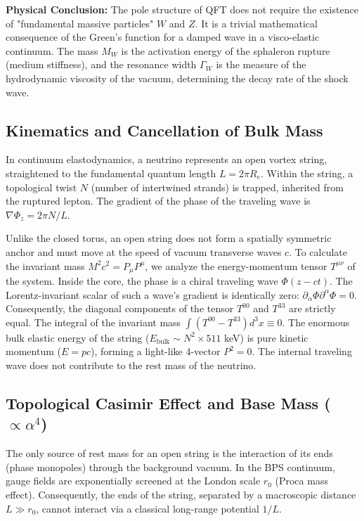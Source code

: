 \documentclass[11pt,a4paper]{article}
\begin{document}
\textbf{Physical Conclusion:} The pole structure of QFT does not require the existence of "fundamental massive particles" $W$ and $Z$. It is a trivial mathematical consequence of the Green's function for a damped wave in a visco-elastic continuum. The mass $M_W$ is the activation energy of the sphaleron rupture (medium stiffness), and the resonance width $\Gamma_W$ is the measure of the hydrodynamic viscosity of the vacuum, determining the decay rate of the shock wave.

\subsection{Kinematics and Cancellation of Bulk Mass}
In continuum elastodynamics, a neutrino represents an open vortex string, straightened to the fundamental quantum length $L = 2\pi R_e$. Within the string, a topological twist $N$ (number of intertwined strands) is trapped, inherited from the ruptured lepton. The gradient of the phase of the traveling wave is $\nabla \Phi_z = 2\pi N / L$.

Unlike the closed torus, an open string does not form a spatially symmetric anchor and must move at the speed of vacuum transverse waves $c$. To calculate the invariant mass $M^2 c^2 = P_\mu P^\mu$, we analyze the energy-momentum tensor $T^{\mu\nu}$ of the system.
Inside the core, the phase is a chiral traveling wave $\Phi(z-ct)$. The Lorentz-invariant scalar of such a wave's gradient is identically zero: $\partial_\alpha \Phi \partial^\alpha \Phi = 0$.
Consequently, the diagonal components of the tensor $T^{00}$ and $T^{33}$ are strictly equal. The integral of the invariant mass $\int (T^{00} - T^{33}) d^3x \equiv 0$. The enormous bulk elastic energy of the string ($E_{\text{bulk}} \sim N^2 \times 511$ keV) is pure kinetic momentum ($E = pc$), forming a light-like 4-vector $P^2 = 0$. The internal traveling wave does not contribute to the rest mass of the neutrino.

\subsection{Topological Casimir Effect and Base Mass ($\propto \alpha^4$)}
The only source of rest mass for an open string is the interaction of its ends (phase monopoles) through the background vacuum.
In the BPS continuum, gauge fields are exponentially screened at the London scale $r_0$ (Proca mass effect). Consequently, the ends of the string, separated by a macroscopic distance $L \gg r_0$, cannot interact via a classical long-range potential $1/L$.
\end{document}
